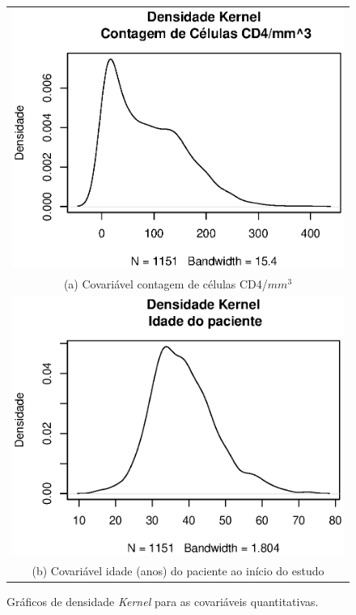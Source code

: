 \documentclass[
	12pt,				%
	openright,			%
	twoside,			%
	a4paper,			%
	english,			%
	brazil				%
	]{abntex2}
\begin{document}
\begin{figure}[!ht]
\centering
  \caption{Gráficos de densidade \textit{Kernel} para as covariáveis quantitativas.}
  \begin{tabular}{c}
    \label{fig:expkern}
  \includegraphics[scale = 0.6]{Rplot11}\\
(a) Covariável contagem de células CD4/$mm^3$ \\
 \includegraphics[scale = 0.6]{Rplot12} \\
(b) Covariável idade (anos) do paciente ao início do estudo \\[6pt]

\end{tabular}
\end{figure}
\end{document}
